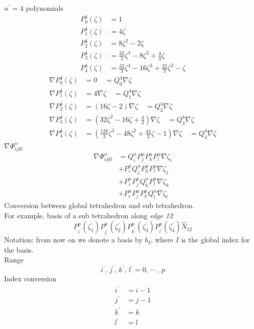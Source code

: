 \documentclass[a4paper,onecolumn]{article}
\begin{document}
$n^\prime=4$ polynomials
\begin{equation*}\begin{split}
    P_0^4(\zeta) &= 1\\
    P_1^4(\zeta) &= 4\zeta\\
    P_2^4(\zeta) &= 8 \zeta^2-2\zeta\\
    P_3^4(\zeta) &= \frac{32}{3}\zeta^3 -8\zeta^2+\frac{4}{3}\zeta\\
    P_4^4(\zeta) &=\frac{32}{3}\zeta^4 -16 \zeta^3 + \frac{22}{3}\zeta^2 -\zeta
\end{split}\end{equation*}
\begin{equation*}\begin{split}
    \nabla P_0^4(\zeta) &= 0 \quad= Q_0^4\nabla \zeta\\
    \nabla P_1^4(\zeta) &= 4\nabla \zeta \quad= Q_1^4\nabla\zeta\\
    \nabla P_2^4(\zeta) &= \left(16\zeta-2\right)\nabla \zeta \quad= Q_2^4\nabla\zeta\\
    \nabla P_3^4(\zeta) &= \left(32\zeta^2 - 16\zeta +\frac{4}{3}\right)\nabla \zeta \quad=Q_3^4\nabla\zeta\\
    \nabla P_4^4(\zeta) &= \left(\frac{128}{3}\zeta^3-48\zeta^2 + \frac{44}{3}\zeta-1\right)\nabla \zeta\quad=Q_4^4\nabla\zeta
\end{split}\end{equation*}
$\nabla\Phi_{ijkl}^n$
\begin{equation*}\begin{split}
    \nabla\Phi_{ijkl}^n &= Q_i^nP_j^nP_k^nP_l^n\nabla\zeta_i\\
    &+P_i^nQ_j^nP_k^nP_l^n\nabla\zeta_j\\
    &+P_i^nP_j^nQ_k^nP_l^n\nabla\zeta_k\\
    &+P_i^nP_j^nP_k^nQ_l^n\nabla\zeta_l
\end{split}\end{equation*}
Conversion between global tetrahedron and sub tetrahedron. \\
For example, basis of a sub tetrahedron along \emph{edge 12}
$$
    P^p_{i^\prime}(\zeta_1^\prime) P^p_{j^\prime}(\zeta_2^\prime)P^p_{k^\prime}(\zeta_3^\prime)P^p_{l^\prime}(\zeta_4^\prime) \hat{N}_{12}
$$
Notation: from now on we denote a basis by $b_I$, where $I$ is the global index for the basis.\\
Range
$$
    i^\prime,\, j^\prime,\, k^\prime,\, l^\prime = 0,\,\cdots\,,\,p
$$
Index conversion
\begin{equation*}\begin{split}
    i^\prime &= i-1\\
    j^\prime &= j-1\\
    k^\prime &=k\\
    l^\prime &=l
\end{split}\end{equation*}
\end{document}

